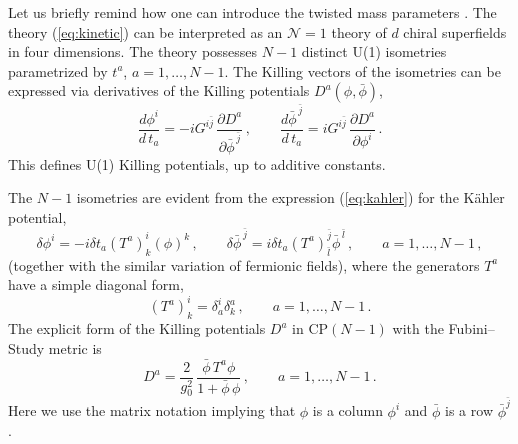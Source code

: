 \documentclass[epsfig,12pt]{article}
\def\beq{\begin{equation}}
\def\eeq{\end{equation}}
\def\beq{\begin{equation}}
\def\eeq{\end{equation}}
\begin{document}
Let us  briefly remind how one can introduce the twisted mass parameters \cite{twisted, Dor}.
The theory (\ref{eq:kinetic}) can be interpreted as an ${\mathcal N}=1$ theory of $d$ chiral superfields 
in four dimensions.  The theory possesses $N-1$ distinct   U(1) isometries 
parametrized by $t^{a}$, $a=1,\ldots,N-1$.
The Killing vectors of the isometries can be expressed via derivatives of the Killing 
potentials $D^{a}(\phi, \bar\phi)$,
\begin{equation}
\label{eq:KillD}
\frac{{d}\phi^{i}}{{  d}\,t_{a}}=-iG^{i\bar j}\,\frac{\partial D^{a}}{\partial \bar\phi^{ \,\bar j}}
\,,\qquad 
\frac{{d}\bar\phi^{ \,\bar j}}{{  d}\,t_{a}}=iG^{i\bar j}\,\frac{\partial D^{a}}{\partial \phi^{i}}\,.
\end{equation}
This defines U(1) Killing potentials, up to additive constants.

The $N -1$ isometries are
 evident from the expression (\ref{eq:kahler}) for the K\"ahler potential, 
\begin{equation}
\label{eq:iso}
\delta\phi^{i}=-i\delta t_{a} (T^{a})^{i}_{k}(\phi)^{k}\,,\qquad 
\delta\bar\phi^{\,\bar j}=i\delta t_{a}(T^{a})^{\bar j}_{\bar l}\bar\phi^{\,\bar l}\,,
\qquad a=1,\ldots, N-1\,,
\end{equation}
(together with the similar variation of fermionic fields),
where the  generators $T^{a}$ have a simple diagonal form,
\begin{equation}
(T^{a})^{i}_{k}=\delta^{i}_{a}\delta^{a}_{k}\,, \qquad a=1,\ldots,N-1\,.
\end{equation}
 The explicit form of the Killing potentials $D^{a}$ in CP$(N\!-\!1)$ with the Fubini--Study metric is
\beq
\label{eq:KillF}
D^{a}=\frac{2}{g_{0}^{2}}\,\frac{\bar\phi\, T^{a}\phi}{1+\bar\phi\,\phi}\,,
\qquad a=1,\ldots,N-1\,.
\eeq
Here we use the matrix notation implying that $\phi$ is a column $\phi^{i}$ and 
$\bar\phi$ is a row $\bar\phi^{ \bar j}$.
\end{document}
